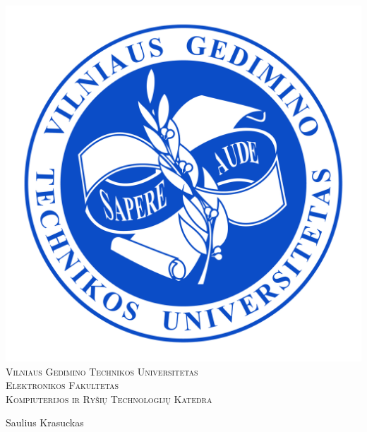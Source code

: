 \documentclass[12pt]{article}
\begin{document}


\begin{titlepage}
\centering

    \vspace*{-9.5pt}
    \includegraphics[scale = 0.105]{Herbas.png}           \\[3.9pt]


{\scshape
    {\Large Vilniaus Gedimino Technikos Universitetas}    \\[1.30pt]
    {\large Elektronikos Fakultetas}                      \\[0.20pt]
    {\large Kompiuterijos ir Ryšių Technologijų Katedra}  \\[106.0pt]
}

    {\large Saulius Krasuckas}                            \\[24.5pt]


\end{titlepage}
\end{document}
